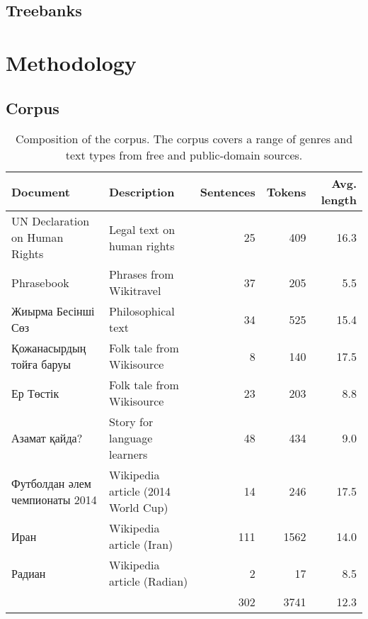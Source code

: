 \documentclass[a4paper,11pt, onecolumn,twoside]{article}
\begin{document}

\subsection{Treebanks} %


\section{Methodology}

\subsection{Corpus}

\begin{table}[htbp]
  \centering
\begin{small}
  \begin{tabular}{|l|l|r|r|r|}
    \hline
    \textbf{Document} & \textbf{Description} & \textbf{Sentences} & \textbf{Tokens} & \textbf{Avg. length}\\
    \hline
    UN Declaration on Human Rights & Legal text on human rights & 25 & 409 & 16.3 \\
    Phrasebook                     & Phrases from Wikitravel   & 37 & 205 & 5.5 \\
    Жиырма Бесінші Сөз             & Philosophical text        & 34 & 525 & 15.4 \\ 
    Қожанасырдың тойға баруы       & Folk tale from Wikisource  & 8 & 140 & 17.5 \\
    Ер Төстік                      & Folk tale from Wikisource  & 23 & 203 & 8.8 \\
    Азамат қайда?                  & Story for language learners & 48 & 434 & 9.0 \\
    Футболдан әлем чемпионаты 2014 & Wikipedia article (2014 World Cup) & 14 & 246 & 17.5 \\
    Иран & Wikipedia article (Iran)                                & 111 & 1562 & 14.0 \\
    Радиан & Wikipedia article (Radian)                            & 2 & 17 & 8.5 \\
    \hline
    \multicolumn{2}{c|}{~} & 302 & 3741 & 12.3 \\\cline{3-5}
  \end{tabular}
\end{small}
  \caption{Composition of the corpus. The corpus covers a range of genres and text types from 
    free and public-domain sources.}
\end{table}
\end{document}
